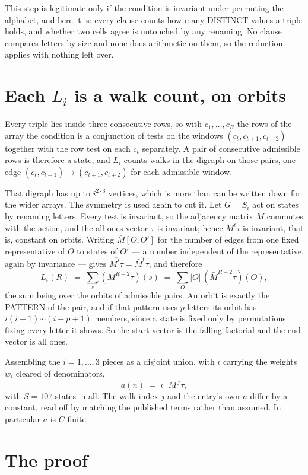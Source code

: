 \documentclass[11pt,a4paper]{article}
\theoremstyle{plain}
\theoremstyle{definition}
\begin{document}
This step is legitimate only if the condition is invariant under permuting the alphabet, and
here it is: every clause counts how many DISTINCT values a triple holds, and whether two cells
agree is untouched by any renaming. No clause compares letters by size and none does arithmetic
on them, so the reduction applies with nothing left over.

\section{Each $L_i$ is a walk count, on orbits}

Every triple lies inside three consecutive rows, so with $c_1,\dots,c_R$ the rows of the array
the condition is a conjunction of tests on the windows $(c_{t},c_{t+1},c_{t+2})$ together
with the row test on each $c_t$ separately. A pair of consecutive admissible rows is therefore
a state, and $L_i$ counts walks in the digraph on those pairs, one edge $(c_t,c_{t+1})\to
(c_{t+1},c_{t+2})$ for each admissible window.

That digraph has up to $i^{2\cdot3}$ vertices, which is more than can be written down for
the wider arrays. The symmetry is used again to cut it. Let $G=S_i$ act on states by renaming
letters. Every test is invariant, so the adjacency matrix $M$ commutes with the action, and the
all-ones vector $\tau$ is invariant; hence $M^{t}\tau$ is invariant, that is, constant on
orbits. Writing $\bar M[O,O']$ for the number of edges from one fixed representative of $O$ to
states of $O'$ --- a number independent of the representative, again by invariance --- gives
$\overline{M^{t}\tau}=\bar M^{t}\bar\tau$, and therefore
\[
L_i(R)\;=\;\sum_{s}(M^{R-2}\tau)(s)\;=\;\sum_{O}|O|\,(\bar M^{R-2}\bar\tau)(O),
\]
the sum being over the orbits of admissible pairs. An orbit is exactly the PATTERN of the pair,
and if that pattern uses $p$ letters its orbit has $i(i-1)\cdots(i-p+1)$ members, since a state
is fixed only by permutations fixing every letter it shows. So the start vector is the falling
factorial and the end vector is all ones.

Assembling the $i=1,\dots,3$ pieces as a disjoint union, with $\iota$ carrying the weights
$w_i$ cleared of denominators,
\[
a(n)\;=\;\iota^{\!\top}M^{\,j}\tau ,
\]
with $S=107$ states in all. The walk index $j$ and the entry's own $n$ differ by a constant,
read off by matching the published terms rather than assumed. In particular $a$ is $C$-finite.

\section{The proof}
\end{document}
